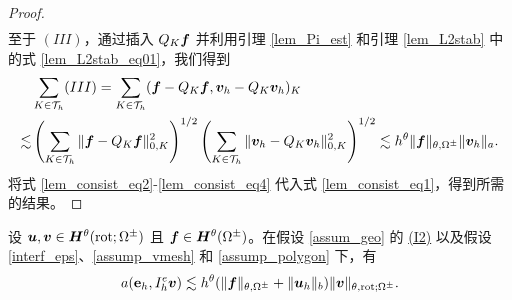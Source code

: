 \begin{proof}
\begin{equation}
\begin{split}
\end{split}
\end{equation}
至于 $(III)$，通过插入 $Q_K \boldsymbol{f}$ 并利用引理 \ref{lem_Pi_est} 和引理 \ref{lem_L2stab} 中的式 \eqref{lem_L2stab_eq01}，我们得到
\begin{equation}
\begin{split}
\label{lem_consist_eq4}
& \sum_{K\in\mathcal{T}_h} (III)  = \sum_{K\in\mathcal{T}_h}  ( \boldsymbol{f} - Q_K \boldsymbol{f}, \boldsymbol{v}_h - Q_K \boldsymbol{v}_h )_K \\
\lesssim & \left(\sum_{K\in\mathcal{T}_h} \| \boldsymbol{f} - Q_K \boldsymbol{f} \|^2_{0,K} \right)^{1/2} \left( \sum_{K\in\mathcal{T}_h} \|  \boldsymbol{v}_h - Q_K \boldsymbol{v}_h  \|^2_{0,K} \right)^{1/2}
\lesssim h^{\theta} \| \boldsymbol{f} \|_{\theta,\Omega^{\pm}}  \| \boldsymbol{v}_h  \|_a.
\end{split}
\end{equation}
将式 \eqref{lem_consist_eq2}-\eqref{lem_consist_eq4} 代入式 \eqref{lem_consist_eq1}，得到所需的结果。

\end{proof}
\begin{lemma}
\label{lem_consist_a}
设 $\boldsymbol{u},\boldsymbol{v}\in \boldsymbol{H}^{\theta}(\mathrm{rot};\Omega^{\pm})$ 且 $\boldsymbol{f}\in \boldsymbol{H}^{\theta}(\Omega^{\pm}) $。在假设 \ref{assum_geo} 的 \hyperref[asp:I2]{(I2)} 以及假设 \ref{interf_eps}、\ref{assump_vmesh} 和 \ref{assump_polygon} 下，有
\begin{equation}
\label{lem_consist_a_eq0}
a(\mathbf{e}_h, I^e_h \boldsymbol{v}) \lesssim h^{\theta} (  \| \boldsymbol{f} \|_{\theta,\Omega^{\pm}} + \| \boldsymbol{u}_h \|_{b} ) \| \boldsymbol{v} \|_{\theta,\mathrm{rot};\Omega^{\pm}}.
\end{equation}
\end{lemma}

